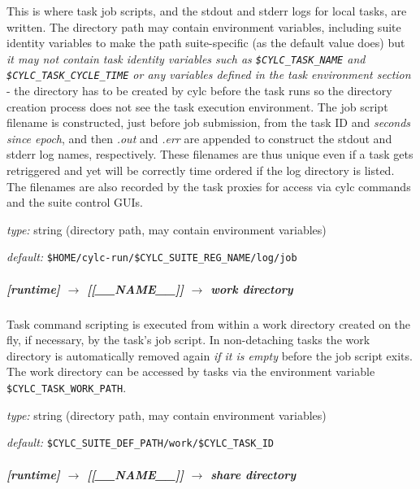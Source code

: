 This is where task job scripts, and the stdout and stderr logs for local
tasks, are written. The directory path may contain environment
variables, including suite identity variables to make the path
suite-specific (as the default value does) but {\em it may not 
contain task identity variables such as \lstinline=$CYLC_TASK_NAME= and
\lstinline=$CYLC_TASK_CYCLE_TIME= or any variables defined in the task
environment section} - the directory has to be created by cylc before
the task runs so the directory creation process does not see the task
execution environment.
The job script filename is constructed, just before job submission,
from the task ID and {\em seconds since epoch}, and then {\em .out} and
{\em .err} are appended to construct the stdout and stderr log names,
respectively. These filenames are thus unique even if a task
gets retriggered and yet will be correctly time ordered if the log
directory is listed. The filenames are also recorded by the task proxies 
for access via cylc commands and the suite control GUIs.
\begin{myitemize}
\item {\em type:} string (directory path, may contain environment variables)
\item {\em default:} \lstinline=$HOME/cylc-run/$CYLC_SUITE_REG_NAME/log/job=
\end{myitemize}

\subparagraph[work directory]{[runtime] $\rightarrow$ [[\_\_NAME\_\_]] $\rightarrow$ work directory}
\label{LocalWork}

Task command scripting is executed from within a work directory created
on the fly, if necessary, by the task's job script. In non-detaching
tasks the work directory is automatically removed again {\em if it is
empty} before the job script exits. The work directory can be accessed
by tasks via the environment variable \lstinline=$CYLC_TASK_WORK_PATH=.

\begin{myitemize}
\item {\em type:} string (directory path, may contain environment variables)
\item {\em default:} \lstinline=$CYLC_SUITE_DEF_PATH/work/$CYLC_TASK_ID=
\end{myitemize}

\subparagraph[share directory]{[runtime] $\rightarrow$ [[\_\_NAME\_\_]] $\rightarrow$ share directory}
\label{LocalShare}

